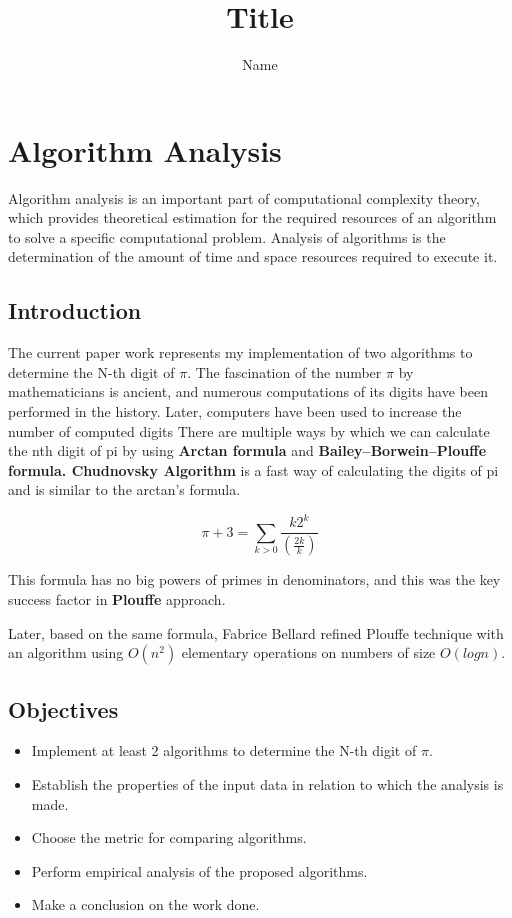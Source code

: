 \documentclass[a4paper, 12pt]{article}
\author{Name}
\title{Title}
\begin{document}

\tableofcontents
\newpage

\section{Algorithm Analysis}

Algorithm analysis is an important part of computational complexity theory, which provides
theoretical estimation for the required resources of an algorithm to solve a specific computational problem. Analysis of algorithms is the determination of the amount of time and space
resources required to execute it.

\subsection{Introduction}

The current paper work represents my implementation of two algorithms to determine the N-th digit of $\pi$.
The fascination of the number $\pi$ by mathematicians is ancient, and numerous computations of its
digits have been performed in the history. Later, computers have been used to increase the number
of computed digits
There are multiple ways by which we can calculate the nth digit of pi by using \textbf{Arctan formula} and \textbf{Bailey–Borwein–Plouffe formula.
    Chudnovsky Algorithm} is a fast way of calculating the digits of pi and is similar to the arctan's formula.

$$
    \pi + 3 = \sum_{k>0} \frac{k2^k}{(\frac{2k}{k})}
$$

This formula has no big powers of primes in denominators, and this was the key success factor in
\textbf{Plouffe} approach.

Later, based on the same formula, Fabrice Bellard refined Plouffe technique with
an algorithm using $O(n^2)$ elementary operations on numbers of size $O(logn)$.

\newpage

\subsection{Objectives}

\begin{itemize}
    \item Implement at least 2 algorithms to determine the N-th digit of $\pi$.
    \item Establish the properties of the input data in relation to which the analysis is made.
    \item Choose the metric for comparing algorithms.
    \item Perform empirical analysis of the proposed algorithms.
    \item Make a conclusion on the work done.
\end{itemize}
\end{document}
